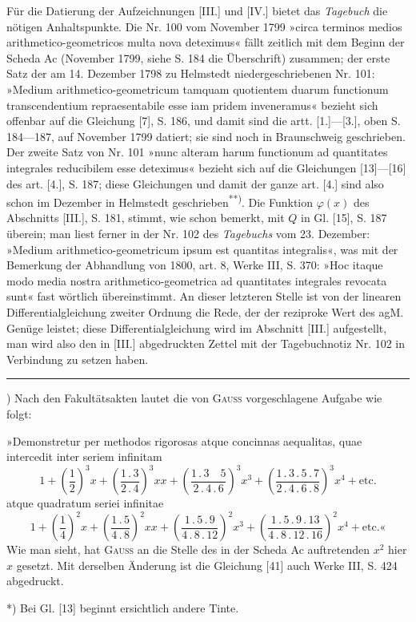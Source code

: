 \par\indent Für die Datierung der Aufzeichnungen [III.] und [IV.] bietet das \textit{Tagebuch} die nötigen Anhaltspunkte. Die Nr. 100 vom November 1799 »circa terminos medios arithmetico-geometricos multa nova deteximus« fällt zeitlich mit dem Beginn der Scheda Ac (November 1799, siehe S. 184 die Überschrift) zusammen; der erste Satz der am 14. Dezember 1798 zu Helmstedt niedergeschriebenen Nr. 101: »Medium arithmetico-geometricum tamquam quotientem duarum functionum transcendentium repraesentabile esse iam pridem inveneramus« bezieht sich offenbar auf die Gleichung [7], S. 186, und damit sind die artt. [1.]—[3.], oben S. 184—187, auf November 1799 datiert; sie sind noch in Braunschweig geschrieben. Der zweite Satz von Nr. 101 »nunc alteram harum functionum ad quantitates integrales reducibilem esse deteximus« bezieht sich auf die Gleichungen [13]—[16] des art. [4.], S. 187; diese Gleichungen und damit der ganze art. [4.] sind also schon im Dezember in Helmstedt geschrieben\textsuperscript{**)}. Die Funktion $\varphi(x)$ des Abschnitts [III.], S. 181, stimmt, wie schon bemerkt, mit $Q$ in Gl. [15], S. 187 überein; man liest ferner in der Nr. 102 des \textit{Tagebuchs} vom 23. Dezember: »Medium arithmetico-geometricum ipsum est quantitas integralis«, was mit der Bemerkung der Abhandlung von 1800, art. 8, Werke III, S. 370: »Hoc itaque modo media nostra arithmetico-geometrica ad quantitates integrales revocata sunt« fast wörtlich übereinstimmt. An dieser letzteren Stelle ist von der linearen Differentialgleichung zweiter Ordnung die Rede, der der reziproke Wert des agM. Genüge leistet; diese Differentialgleichung wird im Abschnitt [III.] aufgestellt, man wird also den in [III.] abgedruckten Zettel mit der Tagebuchnotiz Nr. 102 in Verbindung zu setzen haben.
\par\smallskip\noindent\rule{.25\linewidth}{.4pt}\par
{\small
\par\indent *) Nach den Fakultätsakten lautet die von \textsc{Gauss} vorgeschlagene Aufgabe wie folgt:
\par\noindent »Demonstretur per methodos rigorosas atque concinnas aequalitas, quae intercedit inter seriem infinitam
\[1+\left(\frac12\right)^3x+\left(\frac{1\,.\,3}{2\,.\,4}\right)^3xx+\left(\frac{1\,.\,3\quad5}{2\,.\,4\,.\,6}\right)^3x^3+\left(\frac{1\,.\,3\,.\,5\,.\,7}{2\,.\,4\,.\,6\,.\,8}\right)^3x^4+\text{etc.}\]
\noindent atque quadratum seriei infinitae
\[1+\left(\frac14\right)^2x+\left(\frac{1\,.\,5}{4\,.\,8}\right)^2xx+\left(\frac{1\,.\,5\,.\,9}{4\,.\,8\,.\,12}\right)^2x^3+\left(\frac{1\,.\,5\,.\,9\,.\,13}{4\,.\,8\,.\,12\,.\,16}\right)^2x^4+\text{etc.«}\]
\noindent Wie man sieht, hat \textsc{Gauss} an die Stelle des in der Scheda Ac auftretenden $x^2$ hier $x$ gesetzt. Mit derselben Änderung ist die Gleichung [41] auch Werke III, S. 424 abgedruckt.
\par\indent **) Bei Gl. [13] beginnt ersichtlich andere Tinte.
\par}
